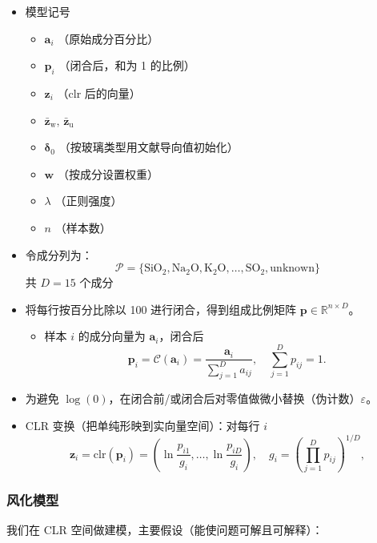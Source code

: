 \documentclass[withoutpreface,bwprint]{cumcmthesis}
\begin{document}
\begin{itemize}
\item 模型记号
\begin{itemize}
    \item $\mathbf{a}_i$ \quad （原始成分百分比）  
    \item $\mathbf{p}_i$ \quad （闭合后，和为 1 的比例）  
    \item $\mathbf{z}_i$ \quad （clr 后的向量）  
    \item $\bar{\mathbf{z}}_\text{w},\, \bar{\mathbf{z}}_\text{u}$ \quad  
    \item $\boldsymbol{\delta}_0$ \quad （按玻璃类型用文献导向值初始化）  
    \item $\mathbf{w}$ \quad （按成分设置权重）  
    \item $\lambda$ \quad （正则强度） 
    \item $n$ \quad （样本数）
\end{itemize}

\item 令成分列为：
\[
    \mathcal{P} = \{\mathrm{SiO}_2, \mathrm{Na}_2\mathrm{O}, \mathrm{K}_2\mathrm{O}, \ldots, \mathrm{SO}_2, \text{unknown}\}
\]
共 $D = 15$ 个成分

\item 将每行按百分比除以 100 进行闭合，得到组成比例矩阵 $\mathbf{p} \in \mathbb{R}^{n \times D}$。
    \begin{itemize}
        \item 样本 $i$ 的成分向量为 $\mathbf{a}_i$，闭合后
        \[
        \mathbf{p}_i = \mathcal{C}(\mathbf{a}_i) = \frac{\mathbf{a}_i}{\sum_{j=1}^D a_{ij}}, \quad \sum_{j=1}^D p_{ij} = 1.
        \]
    \end{itemize}

\item 为避免 $\log(0)$，在闭合前/或闭合后对零值做微小替换（伪计数）$\varepsilon$。

\item CLR 变换（把单纯形映到实向量空间）：对每行 $i$
    \[
    \mathbf{z}_i = \text{clr}(\mathbf{p}_i) = \left( \ln \frac{p_{i1}}{g_i}, \ldots, \ln \frac{p_{iD}}{g_i} \right), \quad g_i = \left( \prod_{j=1}^D p_{ij} \right)^{1/D},
    \]
\end{itemize}

\subsubsection{风化模型}

我们在 CLR 空间做建模，主要假设（能使问题可解且可解释）：
\end{document}
